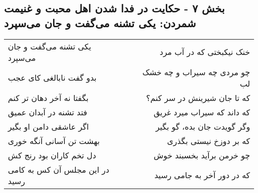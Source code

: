\begin{center}
\section*{بخش ۷ - حکایت در فدا شدن اهل محبت و غنیمت شمردن: یکی تشنه می‌گفت و جان می‌سپرد}
\label{sec:007}
\begin{longtable}{l p{0.5cm} r}
یکی تشنه می‌گفت و جان می‌سپرد
&&
خنک نیکبختی که در آب مرد
\\
بدو گفت نابالغی کای عجب
&&
چو مردی چه سیراب و چه خشک لب
\\
بگفتا نه آخر دهان تر کنم
&&
که تا جان شیرینش در سر کنم؟
\\
فتد تشنه در آبدان عمیق
&&
که داند که سیراب میرد غریق
\\
اگر عاشقی دامن او بگیر
&&
وگر گویدت جان بده، گو بگیر
\\
بهشت تن آسانی آنگه خوری
&&
که بر دوزخ نیستی بگذری
\\
دل تخم کاران بود رنج کش
&&
چو خرمن برآید بخسبند خوش
\\
در این مجلس آن کس به کامی رسید
&&
که در دور آخر به جامی رسید
\\
\end{longtable}
\end{center}
